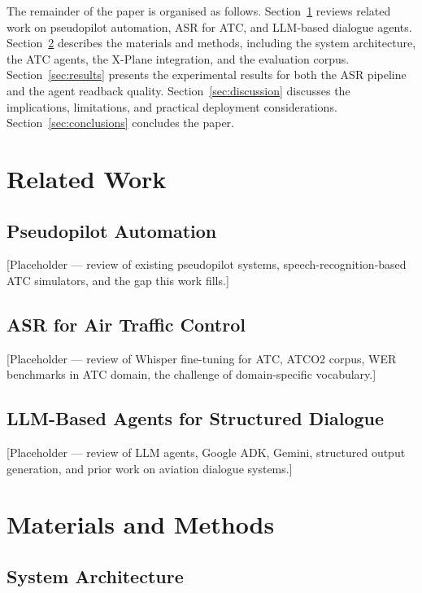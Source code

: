 \documentclass[computers,article,submit,moreauthors,pdftex]{Definitions/mdpi}
\begin{document}
The remainder of the paper is organised as follows. Section~\ref{sec:related}
reviews related work on pseudopilot automation, ASR for ATC, and LLM-based
dialogue agents. Section~\ref{sec:materials} describes the materials and methods,
including the system architecture, the ATC agents, the X-Plane integration, and
the evaluation corpus. Section~\ref{sec:results} presents the experimental
results for both the ASR pipeline and the agent readback quality.
Section~\ref{sec:discussion} discusses the implications, limitations, and
practical deployment considerations. Section~\ref{sec:conclusions} concludes the
paper.

\section{Related Work}
\label{sec:related}

\subsection{Pseudopilot Automation}

[Placeholder — review of existing pseudopilot systems, speech-recognition-based
ATC simulators, and the gap this work fills.]

\subsection{ASR for Air Traffic Control}

[Placeholder — review of Whisper fine-tuning for ATC, ATCO2 corpus,
WER benchmarks in ATC domain, the challenge of domain-specific vocabulary.]

\subsection{LLM-Based Agents for Structured Dialogue}

[Placeholder — review of LLM agents, Google ADK, Gemini, structured output
generation, and prior work on aviation dialogue systems.]

\section{Materials and Methods}
\label{sec:materials}

\subsection{System Architecture}
\end{document}
